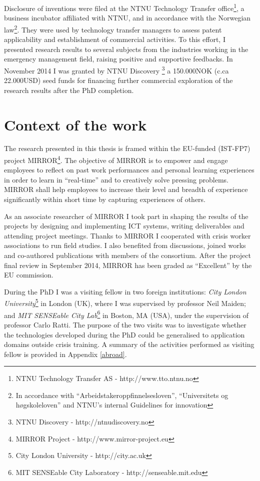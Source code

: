 Disclosure of inventions were filed at the NTNU Technology Transfer office\footnote{NTNU Technology Transfer AS - http://www.tto.ntnu.no}, a business incubator affiliated with NTNU, and in accordance with the Norwegian law\footnote{In accordance with ``Arbeidstakeroppfinnelsesloven'', ``Universitets og høgskoleloven'' and NTNU's internal Guidelines for innovation}. They were used by technology transfer managers to assess patent applicability and establishment of commercial activities. To this effort, I presented research results to several subjects from the industries working in the emergency management field, raising positive and supportive feedbacks. In November 2014 I was granted by NTNU Discovery \footnote{NTNU Discovery - http://ntnudiscovery.no} a 150.000NOK (c.ca 22.000USD) seed funds for financing further commercial exploration of the research results after the PhD completion.

\section{Context of the work}\label{context-of-the-work}

The research presented in this thesis is framed within the EU-funded (IST-FP7) project MIRROR\footnote{MIRROR Project - http://www.mirror-project.eu}. The objective of MIRROR is to empower and engage employees to reflect on past work performances and personal learning experiences in order to learn in “real-time” and to creatively solve pressing problems. MIRROR shall help employees to increase their level and breadth of experience significantly within short time by capturing experiences of others.  

As an associate researcher of MIRROR I took part in shaping the results of the projects by designing and implementing ICT systems, writing deliverables and attending project meetings. Thanks to MIRROR I cooperated with crisis worker associations to run field studies. I also benefited from discussions, joined works and co-authored publications with members of the consortium. After the project final review in September 2014, MIRROR has been graded as ``Excellent'' by the EU commission.

During the PhD I was a visiting fellow in two foreign institutions: \emph{City London University}\footnote{City London University - http://city.ac.uk} in London (UK), where I was supervised by professor Neil Maiden; and \emph{MIT SENSEable City Lab}\footnote{MIT SENSEable City Laboratory - http://senseable.mit.edu} in Boston, MA (USA), under the supervision of professor Carlo Ratti. The purpose of the two visits was to investigate whether the technologies developed during the PhD could be generalised to application domains outside crisis training. A summary of the activities performed as visiting fellow is provided in Appendix \ref{abroad}.

